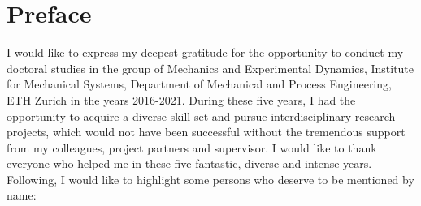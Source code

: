 \chapter*{Preface}
I would like to express my deepest gratitude for the opportunity to conduct my 
doctoral studies in the group of Mechanics and Experimental Dynamics, Institute 
for Mechanical Systems, Department of Mechanical and Process Engineering, ETH 
Zurich in the years 2016-2021. During these five years, I had the opportunity 
to acquire a diverse skill set and pursue interdisciplinary research projects, 
which would not have been successful without the tremendous support from my 
colleagues, project partners and supervisor. I would like to thank everyone who 
helped me in these five fantastic, diverse and intense years. Following, I 
would like to highlight some persons who deserve to be mentioned by name:

